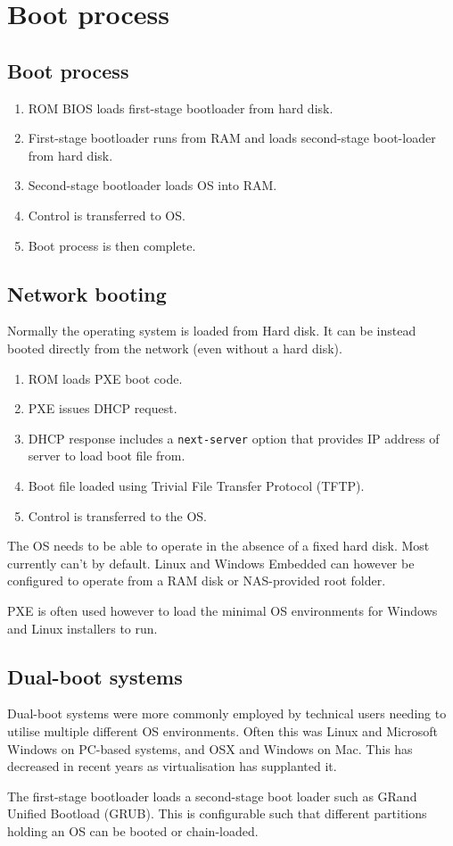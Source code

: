 \chapter{Boot process}
\label{ch:boot-process}

\section{Boot process}

\begin{enumerate}
\item ROM BIOS loads first-stage bootloader from hard disk.
\item First-stage bootloader runs from RAM and loads second-stage boot-loader from hard disk.
\item Second-stage bootloader loads OS into RAM.
\item Control is transferred to OS.
\item Boot process is then complete.
\end{enumerate}

\section{Network booting}

Normally the operating system is loaded from Hard disk.
It can be instead booted directly from the network (even without a hard disk).

\begin{enumerate}
\item ROM loads PXE boot code.
\item PXE issues DHCP request.
\item DHCP response includes a \texttt{next-server} option that provides IP address of server to load boot file from.
\item Boot file loaded using Trivial File Transfer Protocol (TFTP).
\item Control is transferred to the OS. 
\end{enumerate}

The OS needs to be able to operate in the absence of a fixed hard disk.
Most currently can't by default.
Linux and Windows Embedded can however be configured to operate from a RAM disk or NAS-provided root folder.

PXE is often used however to load the minimal OS environments for Windows and Linux installers to run. 


\section{Dual-boot systems}

Dual-boot systems were more commonly employed by technical users needing to utilise multiple different OS environments.
Often this was Linux and Microsoft Windows on PC-based systems, and OSX and Windows on Mac.
This has decreased in recent years as virtualisation has supplanted it.

The first-stage bootloader loads a second-stage boot loader such as GRand Unified Bootload (GRUB).
This is configurable such that different partitions holding an OS can be booted or chain-loaded.

